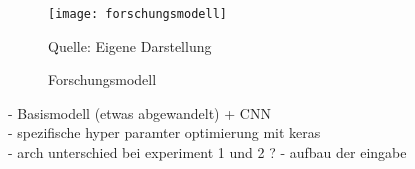 \begin{figure}[H]
	\centering
	\caption{Forschungsmodell}
	\texttt{[image: forschungsmodell]}
	\label{fig:forschungsmodell}
	\vspace{-1.0em}
	\begin{flushleft}
		\small{Quelle: Eigene Darstellung}
	\end{flushleft}
\end{figure}

- Basismodell (etwas abgewandelt) + CNN \\
- spezifische hyper paramter optimierung mit keras \\
- arch unterschied bei experiment 1 und 2 ?
- aufbau der eingabe








